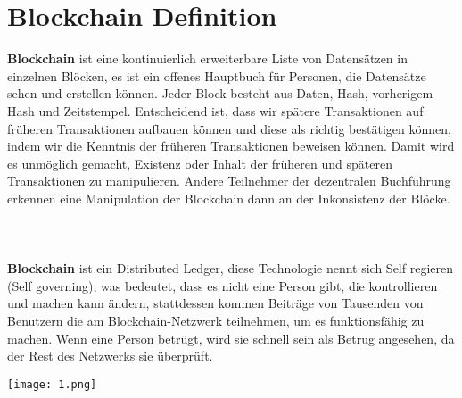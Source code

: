 \documentclass[ngerman]{scrreprt}
\begin{document}
\section{Blockchain Definition}
\textbf{Blockchain} ist eine kontinuierlich erweiterbare Liste von Datensätzen in einzelnen Blöcken, es ist ein offenes Hauptbuch für Personen, die Datensätze sehen und erstellen können. Jeder Block besteht aus Daten, Hash, vorherigem Hash und Zeitstempel. Entscheidend ist, dass wir spätere Transaktionen auf früheren Transaktionen aufbauen können und diese als richtig bestätigen können, indem wir die Kenntnis der früheren Transaktionen beweisen können. Damit wird es unmöglich gemacht, Existenz oder Inhalt der früheren und späteren Transaktionen zu manipulieren. Andere Teilnehmer der dezentralen Buchführung erkennen eine Manipulation der Blockchain dann an der Inkonsistenz der Blöcke.\\
\\
\\
\\
\textbf{Blockchain} ist ein Distributed Ledger, diese Technologie nennt sich Self regieren (Self governing), was bedeutet, dass es nicht eine Person gibt, die kontrollieren und machen kann
ändern, stattdessen kommen Beiträge von Tausenden von Benutzern
die am Blockchain-Netzwerk teilnehmen, um es funktionsfähig zu machen. Wenn eine Person betrügt, wird sie schnell sein
als Betrug angesehen, da der Rest des Netzwerks sie überprüft.


\texttt{[image: 1.png]}
\end{document}
